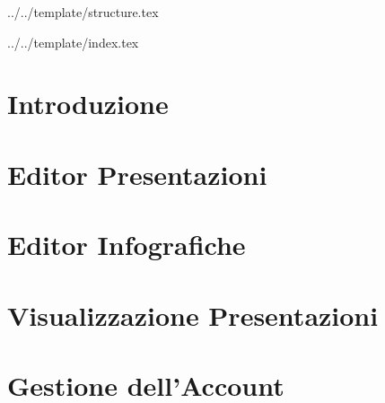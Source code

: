 

\def\DOCUMENTO{Manuale Utente}
\def\VERSIONE{1.0.0}

\def\DESCRIZIONE{Documento che facilita l'utilizzo dell'applicazione da parte dell'utente.}

\def\REDATTORE {Crespan Emanuele}
\def\VERIFICATORE {Agostinetto Matteo}
\def\RESPONSABILE {Suierica Bogdan}

\def\USO {Esterno}

\def\DISTRIBUZIONE {\GRUPPO{}\\ & \COMMITTENTE{}\\ & Piccoli Gregorio, \textit{Zucchetti spa}\\}


\def\INDICE	{true}
\def\TABELLE {true}
\def\FIGURE {true}


 {../../template/structure.tex}


 {../../template/index.tex}

\section{Introduzione}

\newpage

\newpage
\section{Editor Presentazioni}

\newpage
\section{Editor Infografiche}

\newpage
\section{Visualizzazione Presentazioni}

\newpage
\section{Gestione dell'Account}






